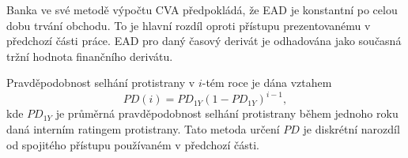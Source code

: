 \documentclass[a4paper,12pt]{report}
\theoremstyle{definition} \newtheorem{definice}[veta]{Definice}
\theoremstyle{remark}
\begin{document}
Banka ve své metodě výpočtu CVA předpokládá, že EAD je konstantní po celou dobu trvání obchodu.
To je hlavní rozdíl oproti přístupu prezentovanému v předchozí části práce.
EAD pro daný časový derivát je odhadována jako současná tržní hodnota finančního derivátu. 	

Pravděpodobnost selhání protistrany v $i$-tém roce je dána vztahem 
\begin{equation}\label{PD_banka}
PD(i)=PD_{1Y}(1-PD_{1Y})^{i-1},
\end{equation}
kde $PD_{1Y}$ je průměrná pravděpodobnost selhání protistrany během jednoho roku daná interním ratingem protistrany. 
Tato metoda určení $PD$ je diskrétní narozdíl od spojitého přístupu používaném v předchozí části. 

\begin{table}
  \centering 
{}
\vspace{0,5cm}
\caption{Srovnání výsledků výpočtů CVA dle metody popsané v této práci a dle metody používané v bance}
\label{srovnaniCVA}
\end{table}



\nocite{}  %

\cleardoublepage
{} 

%


\end{document}
